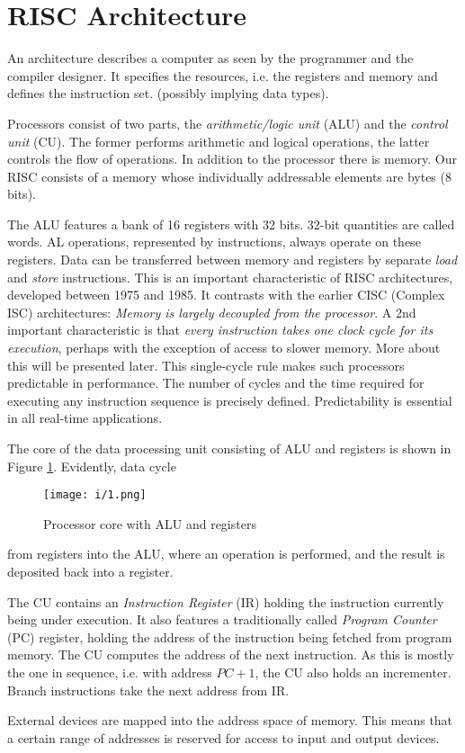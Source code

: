 \section{RISC Architecture}
\label{ch:arch}
An architecture describes a computer as seen by the programmer and the compiler designer. It
specifies the resources, i.e. the registers and memory and defines the instruction set. (possibly
implying data types).

Processors consist of two parts, the \emph{arithmetic/logic unit} (ALU) and the \emph{control unit} (CU).
The former performs arithmetic and logical operations, the latter controls the flow of operations. In
addition to the processor there is memory. Our RISC consists of a memory whose individually addressable
elements are bytes (8 bits).

The ALU features a bank of 16 registers with 32 bits. 32-bit quantities are called words. AL operations,
represented by instructions, always operate on these registers. Data can be transferred between memory
and registers by separate \emph{load} and \emph{store} instructions. This is an important characteristic
of RISC architectures, developed between 1975 and 1985. It contrasts with the earlier CISC (Complex ISC)
architectures: \emph{Memory is largely decoupled from the processor}. A 2nd important characteristic is
that \emph{every instruction takes one clock cycle for its execution}, perhaps with the exception of
access to slower memory. More about this will be presented later. This single-cycle rule makes such
processors predictable in performance. The number of cycles and the time required for executing any
instruction sequence is precisely defined. Predictability is essential in all real-time applications.

The core of the data processing unit consisting of ALU and registers is shown in Figure \ref{fig:alu}.
Evidently, data cycle
\begin{figure}
  \centering
  \texttt{[image: i/1.png]}
  \caption{Processor core with ALU and registers}
  \label{fig:alu}
\end{figure}
from registers into the ALU, where an operation is performed, and the result is deposited back into a register.

The CU contains an \emph{Instruction Register} (IR) holding the instruction currently being under execution.
It also features a traditionally called \emph{Program Counter} (PC) register, holding the address of the
instruction being fetched from program memory. The CU computes the address of the next instruction. As this
is mostly the one in sequence, i.e. with address $PC+1$, the CU also holds an incrementer. Branch instructions
take the next address from IR.

External devices are mapped into the address space of memory. This means that a certain range of
addresses is reserved for access to input and output devices.
